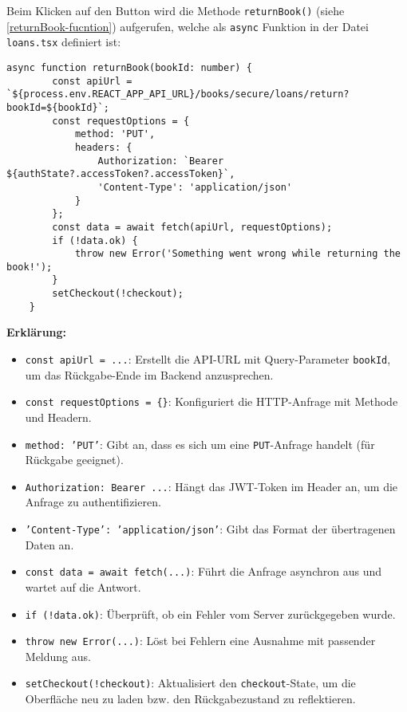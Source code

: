 \noindent Beim Klicken auf den Button wird die Methode \texttt{returnBook()} (siehe \ref{returnBook-fucntion}) aufgerufen, welche als \texttt{async} Funktion in der Datei \texttt{loans.tsx} definiert ist:


\begin{lstlisting}[style=pseudocode, caption=returnBook() in Loans.tsx, label=returnBook-fucntion, breaklines=true]
	async function returnBook(bookId: number) {
		const apiUrl = `${process.env.REACT_APP_API_URL}/books/secure/loans/return?bookId=${bookId}`;
		const requestOptions = {
			method: 'PUT',
			headers: {
				Authorization: `Bearer ${authState?.accessToken?.accessToken}`,
				'Content-Type': 'application/json'
			}
		};
		const data = await fetch(apiUrl, requestOptions);
		if (!data.ok) {
			throw new Error('Something went wrong while returning the book!');
		}
		setCheckout(!checkout);
	}
\end{lstlisting}

\noindent \textbf{Erklärung:}
\begin{itemize}
	\item \texttt{const apiUrl = ...}: Erstellt die API-URL mit Query-Parameter \texttt{bookId}, um das Rückgabe-Ende im Backend anzusprechen.
	\item \texttt{const requestOptions = \{\}}: Konfiguriert die HTTP-Anfrage mit Methode und Headern.
	\item \texttt{method: 'PUT'}: Gibt an, dass es sich um eine \texttt{PUT}-Anfrage handelt (für Rückgabe geeignet).
	\item \texttt{Authorization: \texttt{Bearer ...}}: Hängt das JWT-Token im Header an, um die Anfrage zu authentifizieren.
	\item \texttt{'Content-Type': 'application/json'}: Gibt das Format der übertragenen Daten an.
	\item \texttt{const data = await fetch(...)}: Führt die Anfrage asynchron aus und wartet auf die Antwort.
	\item \texttt{if (!data.ok)}: Überprüft, ob ein Fehler vom Server zurückgegeben wurde.
	\item \texttt{throw new Error(...)}: Löst bei Fehlern eine Ausnahme mit passender Meldung aus.
	\item \texttt{setCheckout(!checkout)}: Aktualisiert den \texttt{checkout}-State, um die Oberfläche neu zu laden bzw. den Rückgabezustand zu reflektieren.
\end{itemize}
